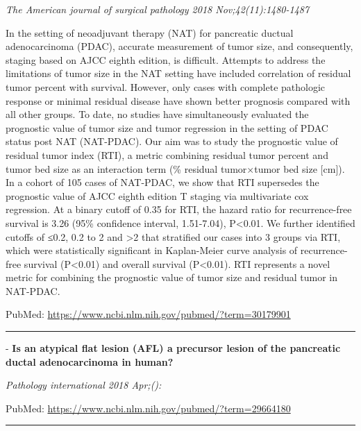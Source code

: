 \documentclass[]{article}
\begin{document}
\emph{The American journal of surgical pathology 2018
Nov;42(11):1480-1487}

In the setting of neoadjuvant therapy (NAT) for pancreatic ductual
adenocarcinoma (PDAC), accurate measurement of tumor size, and
consequently, staging based on AJCC eighth edition, is difficult.
Attempts to address the limitations of tumor size in the NAT setting
have included correlation of residual tumor percent with survival.
However, only cases with complete pathologic response or minimal
residual disease have shown better prognosis compared with all other
groups. To date, no studies have simultaneously evaluated the prognostic
value of tumor size and tumor regression in the setting of PDAC status
post NAT (NAT-PDAC). Our aim was to study the prognostic value of
residual tumor index (RTI), a metric combining residual tumor percent
and tumor bed size as an interaction term (\% residual tumor×tumor bed
size {[}cm{]}). In a cohort of 105 cases of NAT-PDAC, we show that RTI
supersedes the prognostic value of AJCC eighth edition T staging via
multivariate cox regression. At a binary cutoff of 0.35 for RTI, the
hazard ratio for recurrence-free survival is 3.26 (95\% confidence
interval, 1.51-7.04), P\textless{}0.01. We further identified cutoffs of
≤0.2, 0.2 to 2 and \textgreater{}2 that stratified our cases into 3
groups via RTI, which were statistically significant in Kaplan-Meier
curve analysis of recurrence-free survival (P\textless{}0.01) and
overall survival (P\textless{}0.01). RTI represents a novel metric for
combining the prognostic value of tumor size and residual tumor in
NAT-PDAC.

PubMed: \url{https://www.ncbi.nlm.nih.gov/pubmed/?term=30179901}

{}

{}

\begin{center}\rule{0.5\linewidth}{\linethickness}\end{center}

 - \textbf{Is an atypical flat lesion (AFL) a precursor lesion of the
pancreatic ductal adenocarcinoma in human?}

\emph{Pathology international 2018 Apr;():}

PubMed: \url{https://www.ncbi.nlm.nih.gov/pubmed/?term=29664180}

{}

{}

\begin{center}\rule{0.5\linewidth}{\linethickness}\end{center}
\end{document}
